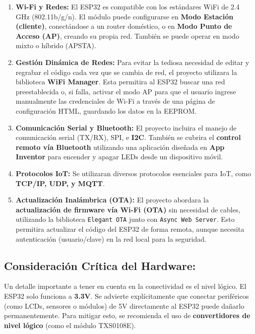 \documentclass{article}
\begin{document}
\begin{enumerate}
    \item \textbf{Wi-Fi y Redes:} El ESP32 es compatible con los 
    estándares WiFi de 2.4 GHz (802.11b/g/n). El módulo puede 
    configurarse en \textbf{Modo Estación (cliente)}, conectándose a un 
    router doméstico, o en \textbf{Modo Punto de Acceso (AP)}, creando 
    su propia red. También se puede operar en modo mixto o híbrido 
    (APSTA).

    \item \textbf{Gestión Dinámica de Redes:} Para evitar la tediosa 
    necesidad de editar y regrabar el código cada vez que se cambia 
    de red, el proyecto utilizara la biblioteca \textbf{WiFi Manager}. 
    Esta permitira al ESP32 buscar una red preestablecida o, si falla, 
    activar el modo AP para que el usuario ingrese manualmente las 
    credenciales de Wi-Fi a través de una página de configuración HTML, 
    guardando los datos en la EEPROM.

    \item \textbf{Comunicación Serial y Bluetooth:} El proyecto incluira 
    el manejo de comunicación serial (TX/RX), SPI, e \textbf{I2C}. 
    También se cubrira el \textbf{control remoto vía Bluetooth} 
    utilizando una aplicación diseñada en \textbf{App Inventor} para 
    encender y apagar LEDs desde un dispositivo móvil.

    \item \textbf{Protocolos IoT:} Se utilizaran diversos protocolos 
    esenciales para IoT, como \textbf{TCP/IP, UDP, y MQTT}.

    \item \textbf{Actualización Inalámbrica (OTA):} El proyecto abordara 
    la \textbf{actualización de firmware vía Wi-Fi (OTA)} sin necesidad 
    de cables, utilizando la biblioteca \texttt{Elegant OTA} junto con 
    \texttt{Async Web Server}. Esto permitira actualizar el código del 
    ESP32 de forma remota, aunque necesita autenticación (usuario/clave) 
    en la red local para la seguridad.
\end{enumerate}

\subsection*{Consideración Crítica del Hardware:}

Un detalle importante a tener en cuenta en la conectividad es el nivel 
lógico. El ESP32 solo funciona a \textbf{3.3V}. Se advierte 
explícitamente que conectar periféricos (como LCDs, sensores o módulos) 
de 5V directamente al ESP32 puede dañarlo permanentemente. Para mitigar 
esto, se recomienda el uso de \textbf{convertidores de nivel lógico} 
(como el módulo TXS0108E).
\end{document}
